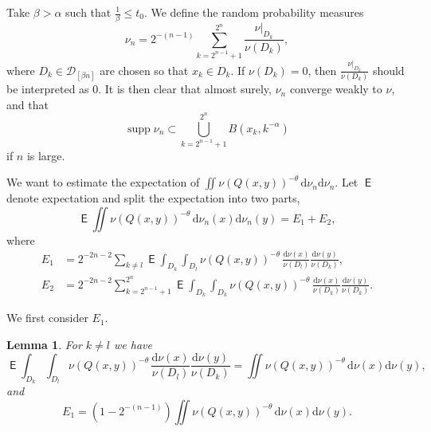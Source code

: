 \documentclass[11pt]{article}
\newtheorem{lemm}[theo]{Lemma}
\theoremstyle{definition}
\numberwithin{equation}{section}
\numberwithin{figure}{section}
\numberwithin{table}{section}
\DeclareMathOperator{\supp}{supp}
\DeclareMathOperator{\E}{\mathsf{E}}
\newcommand*{\dd}{\mathrm{d}}
\begin{document}
Take $\beta > \alpha$ such that $\frac{1}{\beta} \leq t_0$. We define the random probability measures
\[
\nu_n = 2^{-(n-1)} \sum_{k=2^{n-1}+1}^{2^n} \frac{\nu|_{D_k}}{\nu (D_k)},
\]
where $D_k \in \mathscr{D}_{[\beta n]}$ are chosen so that $x_k \in D_k$. If $\nu (D_k) = 0$, then $\frac{\nu|_{D_k}}{\nu (D_k)}$ should be interpreted as $0$. It is then clear that almost surely, $\nu_n$ converge weakly to $\nu$, and that
\[
\supp \nu_n \subset \bigcup_{k=2^{n-1}+1}^{2^n} B (x_k, k^{-\alpha})
\]
if $n$ is large.

We want to estimate the expectation of $\iint \nu(Q(x,y))^{-\theta} \,
\dd \nu_n \dd \nu_n$. Let $\E$ denote expectation and split the expectation into two parts,
\[
\E \iint \nu (Q(x,y))^{-\theta} \, \dd \nu_n (x) \dd
\nu_n (y) = E_1 + E_2,
\]
where
\begin{align*}
E_1 &= 2^{-2n-2} \sum_{k \neq l} \E \int_{D_k} \int_{D_l} \nu (Q(x,y))^{-\theta} \, \frac{\dd \nu (x)}{\nu (D_l)}
\frac{\dd \nu (y)}{\nu (D_k)}, \\ E_2 &= 2^{-2n-2}
\sum_{k=2^{n-1}+1}^{2^n} \E \int_{D_k} \int_{D_k} \nu (Q(x,y))^{-\theta} \, \frac{\dd \nu (x)}{\nu (D_k)}
\frac{\dd \nu (y)}{\nu (D_k)}.
\end{align*}

We first consider $E_1$.

\begin{lemm}\label{lem:E1}
For $k \neq l$ we have
\[
\E \int_{D_k} \int_{D_l} \nu (Q(x,y))^{-\theta} \, \frac{\dd
\nu (x)}{\nu (D_l)} \frac{\dd \nu (y)}{\nu (D_k)} = \iint
\nu(Q(x,y))^{-\theta} \, \dd \nu (x) \dd \nu (y),
\]
and
\[
E_1 = (1 - 2^{-(n-1)}) \iint \nu(Q(x,y))^{-\theta} \, \dd \nu (x) \dd \nu (y).
\]
\end{lemm}
\end{document}
